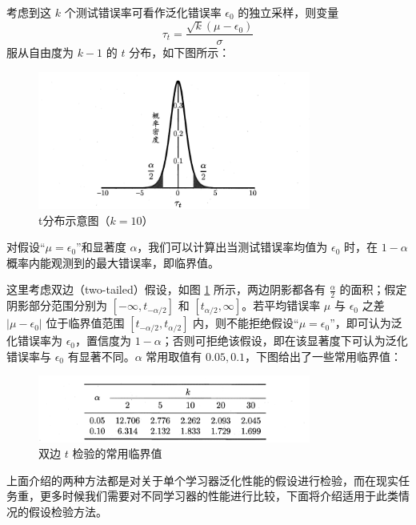 \documentclass[12pt, a4paper]{article} %
\begin{document}
考虑到这 $k$ 个测试错误率可看作泛化错误率 $\epsilon_0$ 的独立采样，则变量
\begin{equation*}
    \tau _t = \frac{\sqrt{k}(\mu - \epsilon_0)}{\sigma}
\end{equation*}
服从自由度为 $k - 1$ 的 $t$ 分布，如下图所示：

\begin{figure}[H]
    \centering
    \includegraphics[width=0.8\textwidth]{../img/2-8-t分布示意图.png}
    \caption{t分布示意图（$k = 10$）}
    \label{fig:t分布示意图}
\end{figure}

对假设“$\mu = \epsilon_0$”和显著度 $\alpha$，我们可以计算出当测试错误率均值为 $\epsilon_0$ 时，在 $1 - \alpha$ 概率内能观测到的最大错误率，即临界值。

这里考虑双边（two-tailed）假设，如图 \ref{fig:t分布示意图} 所示，两边阴影都各有 $\displaystyle \frac{\alpha}{2}$ 的面积；假定阴影部分范围分别为 $[-\infty, t_{- \alpha / 2}]$ 和 $[t_{\alpha / 2}, \infty]$。若平均错误率 $\mu$ 与 $\epsilon_0$ 之差 $|\mu - \epsilon_0|$ 位于临界值范围 $[t_{- \alpha / 2}, t_{\alpha / 2}]$ 内，则不能拒绝假设“$\mu = \epsilon_0$”，即可认为泛化错误率为 $\epsilon_0$，置信度为 $1 - \alpha$；否则可拒绝该假设，即在该显著度下可认为泛化错误率与 $\epsilon_0$ 有显著不同。$\alpha$ 常用取值有 $0.05, 0.1$，下图给出了一些常用临界值：

\begin{figure}[H]
    \centering
    \includegraphics[width=0.8\textwidth]{../img/2-9-双边t检验的常用临界值.png}
    \caption{双边 $t$ 检验的常用临界值}
    \label{fig:双边t检验的常用临界值}
\end{figure}

上面介绍的两种方法都是对关于单个学习器泛化性能的假设进行检验，而在现实任务重，更多时候我们需要对不同学习器的性能进行比较，下面将介绍适用于此类情况的假设检验方法。
\end{document}
